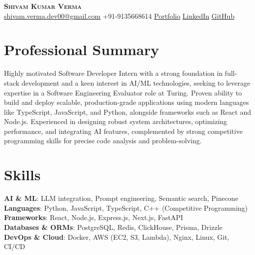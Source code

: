 \documentclass[letterpaper,10pt]{article}
\begin{document}
\begin{center}
  \textbf{\Huge \scshape Shivam Kumar Verma} \\ \vspace{4pt}
  \small \href{mailto:shivam.verma.dev00@gmail.com}{shivam.verma.dev00@gmail.com} \textbullet{} +91-9135668614 \textbullet{} \href{Portfolio}{Portfolio} \textbullet{} \href{LinkedIn}{LinkedIn} \textbullet{} \href{GitHub}{GitHub}
\end{center}

\section{Professional Summary}
\vspace{3pt}
\small{Highly motivated Software Developer Intern with a strong foundation in full-stack development and a keen interest in AI/ML technologies, seeking to leverage expertise in a Software Engineering Evaluator role at Turing. Proven ability to build and deploy scalable, production-grade applications using modern languages like TypeScript, JavaScript, and Python, alongside frameworks such as React and Node.js. Experienced in designing robust system architectures, optimizing performance, and integrating AI features, complemented by strong competitive programming skills for precise code analysis and problem-solving.}

\section{Skills}
\begin{itemize}[leftmargin=0.15in, label={}]
  \small{\item{
    \textbf{AI \& ML}{: LLM integration, Prompt engineering, Semantic search, Pinecone} \\ \vspace{2pt}
    \textbf{Languages}{: Python, JavaScript, TypeScript, C++ (Competitive Programming)} \\ \vspace{2pt}
    \textbf{Frameworks}{: React, Node.js, Express.js, Next.js, FastAPI} \\ \vspace{2pt}
    \textbf{Databases \& ORMs}{: PostgreSQL, Redis, ClickHouse, Prisma, Drizzle} \\ \vspace{2pt}
    \textbf{DevOps \& Cloud}{: Docker, AWS (EC2, S3, Lambda), Nginx, Linux, Git, CI/CD}
  }}
\end{itemize}
\end{document}
